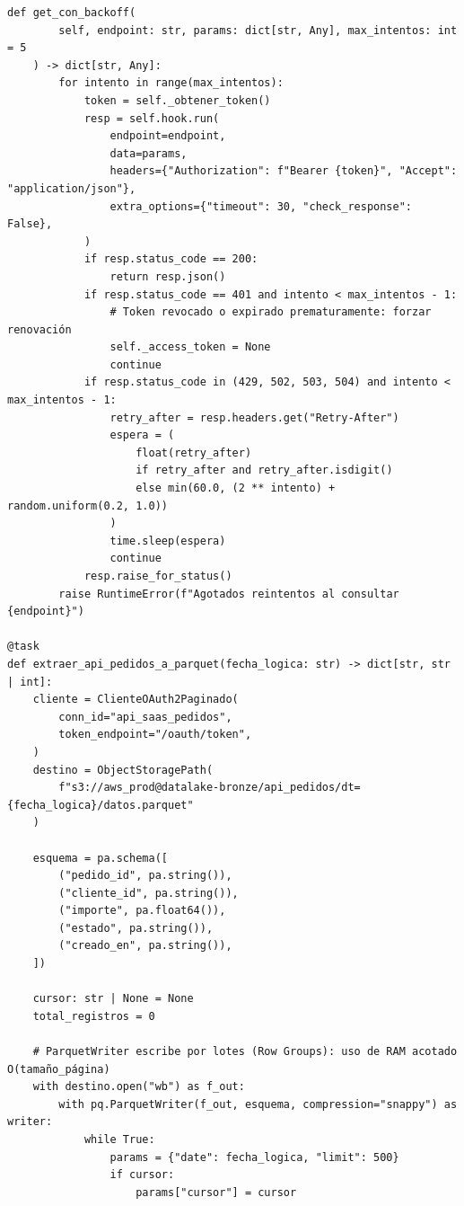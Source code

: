 \begin{lstlisting}[style=python, caption={Extracción paginada (cursor-based) con OAuth2 renovable, control de \texttt{Retry-After} y escritura directa a Parquet.}, label={lst:http-paginacion-oauth2}]
    def get_con_backoff(
        self, endpoint: str, params: dict[str, Any], max_intentos: int = 5
    ) -> dict[str, Any]:
        for intento in range(max_intentos):
            token = self._obtener_token()
            resp = self.hook.run(
                endpoint=endpoint,
                data=params,
                headers={"Authorization": f"Bearer {token}", "Accept": "application/json"},
                extra_options={"timeout": 30, "check_response": False},
            )
            if resp.status_code == 200:
                return resp.json()
            if resp.status_code == 401 and intento < max_intentos - 1:
                # Token revocado o expirado prematuramente: forzar renovación
                self._access_token = None
                continue
            if resp.status_code in (429, 502, 503, 504) and intento < max_intentos - 1:
                retry_after = resp.headers.get("Retry-After")
                espera = (
                    float(retry_after)
                    if retry_after and retry_after.isdigit()
                    else min(60.0, (2 ** intento) + random.uniform(0.2, 1.0))
                )
                time.sleep(espera)
                continue
            resp.raise_for_status()
        raise RuntimeError(f"Agotados reintentos al consultar {endpoint}")

@task
def extraer_api_pedidos_a_parquet(fecha_logica: str) -> dict[str, str | int]:
    cliente = ClienteOAuth2Paginado(
        conn_id="api_saas_pedidos",
        token_endpoint="/oauth/token",
    )
    destino = ObjectStoragePath(
        f"s3://aws_prod@datalake-bronze/api_pedidos/dt={fecha_logica}/datos.parquet"
    )

    esquema = pa.schema([
        ("pedido_id", pa.string()),
        ("cliente_id", pa.string()),
        ("importe", pa.float64()),
        ("estado", pa.string()),
        ("creado_en", pa.string()),
    ])

    cursor: str | None = None
    total_registros = 0

    # ParquetWriter escribe por lotes (Row Groups): uso de RAM acotado O(tamaño_página)
    with destino.open("wb") as f_out:
        with pq.ParquetWriter(f_out, esquema, compression="snappy") as writer:
            while True:
                params = {"date": fecha_logica, "limit": 500}
                if cursor:
                    params["cursor"] = cursor


\end{lstlisting}
